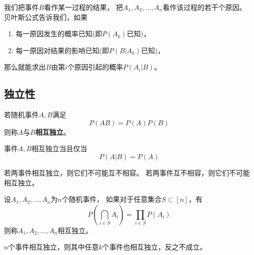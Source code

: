 \begin{remark}
  我们把事件$B$看作某一过程的结果，
  把$A_1,A_2,\dots,A_n$看作该过程的若干个原因。
  贝叶斯公式告诉我们，如果
  \begin{enumerate}
    \item
    每一原因发生的概率已知(即$P(A_k)$已知)，
    \item
    每一原因对结果的影响已知(即$P(B|A_k)$已知)，
  \end{enumerate}
  那么就能求出$B$由第$i$个原因引起的概率$P(A_i|B)$。
\end{remark}

\subsection{独立性}
\begin{definition}[两个随机事件的相互独立性]
  若随机事件$A,B$满足
  \begin{displaymath}
    P(AB)=P(A)P(B)
  \end{displaymath}
  则称$A$与$B$\textbf{相互独立}。
\end{definition}

\begin{theorem}[两个随机事件相互独立的充要条件]
  事件$A,B$相互独立当且仅当
  \begin{displaymath}
    P(A|B) = P(A)
  \end{displaymath}
\end{theorem}

\begin{theorem}[相互独立与互不相容的关系]
  若两事件相互独立，则它们不可能互不相容。
  若两事件互不相容，则它们不可能相互独立。
\end{theorem}

\begin{definition}[$n$个事件的相互独立性]
  设$A_1,A_2,\dots,A_n$为$n$个随机事件，
  如果对于任意集合$S \subset[n]$，有
  \begin{displaymath}
    P\left(\bigcap_{i\in S} A_i\right) = \prod_{i\in S}P(A_i)
  \end{displaymath}
  则称$A_1,A_2,\dots,A_n$相互独立。
\end{definition}

\begin{remark}
  $n$个事件相互独立，则其中任意$k$个事件也相互独立，反之不成立。
\end{remark}
